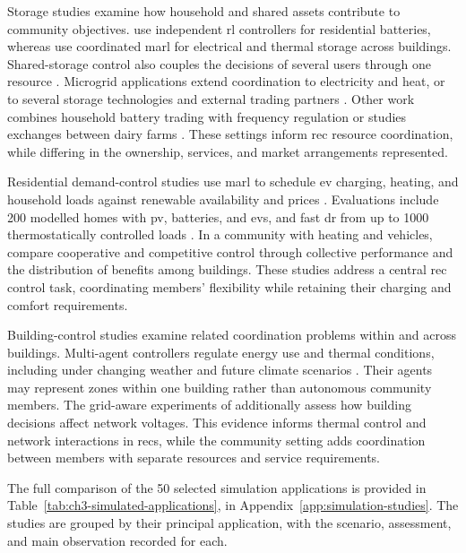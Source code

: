 Storage studies examine how household and shared assets contribute to community objectives. \textcite{nweye2023merlin} use independent \gls{rl} controllers for residential batteries, whereas \textcite{savino2025attention} use coordinated \gls{marl} for electrical and thermal storage across buildings. Shared-storage control also couples the decisions of several users through one resource \parencite{recN14}. Microgrid applications extend coordination to electricity and heat, or to several storage technologies and external trading partners \parencite{recN16,recN13}. Other work combines household battery trading with frequency regulation or studies exchanges between dairy farms \parencite{recC27,recC26}. These settings inform \gls{rec} resource coordination, while differing in the ownership, services, and market arrangements represented.

Residential demand-control studies use \gls{marl} to schedule \gls{ev} charging, heating, and household loads against renewable availability and prices \parencite{recC19,recC20,recC21,charbonnier2022scalable,recN01}. Evaluations include 200 modelled homes with \gls{pv}, batteries, and \glspl{ev}, and fast \gls{dr} from up to 1000 thermostatically controlled loads \parencite{recN19,mai2024demandresponse}. In a community with heating and vehicles, \textcite{wilk2024smartcommunity} compare cooperative and competitive control through collective performance and the distribution of benefits among buildings. These studies address a central \gls{rec} control task, coordinating members' flexibility while retaining their charging and comfort requirements.

Building-control studies examine related coordination problems within and across buildings. Multi-agent controllers regulate energy use and thermal conditions, including under changing weather and future climate scenarios \parencite{yu2021hvac,recC03,recS38}. Their agents may represent zones within one building rather than autonomous community members. The grid-aware experiments of \textcite{pigott2022gridlearn} additionally assess how building decisions affect network voltages. This evidence informs thermal control and network interactions in \glspl{rec}, while the community setting adds coordination between members with separate resources and service requirements.

The full comparison of the 50 selected simulation applications is provided in Table~\ref{tab:ch3-simulated-applications}, in Appendix~\ref{app:simulation-studies}. The studies are grouped by their principal application, with the scenario, assessment, and main observation recorded for each.


